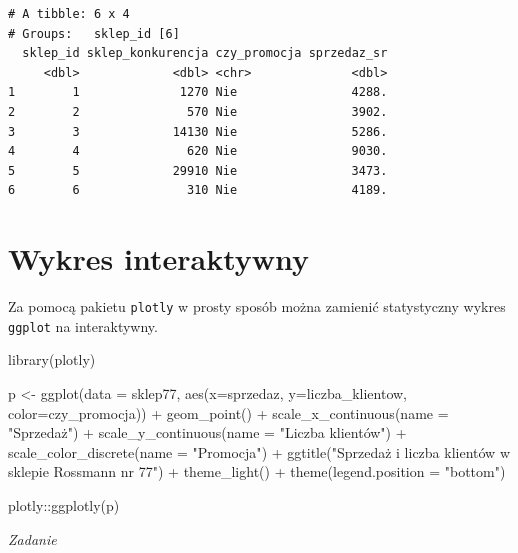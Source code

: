 \documentclass[
  letterpaper,
  DIV=11,
  numbers=noendperiod]{scrreprt}
\newenvironment{Shaded}{\begin{snugshade}}{\end{snugshade}}
\newcommand{\AttributeTok}[1]{\textcolor[rgb]{0.40,0.45,0.13}{#1}}
\newcommand{\FunctionTok}[1]{\textcolor[rgb]{0.28,0.35,0.67}{#1}}
\newcommand{\NormalTok}[1]{\textcolor[rgb]{0.00,0.23,0.31}{#1}}
\newcommand{\OtherTok}[1]{\textcolor[rgb]{0.00,0.23,0.31}{#1}}
\newcommand{\SpecialCharTok}[1]{\textcolor[rgb]{0.37,0.37,0.37}{#1}}
\newcommand{\StringTok}[1]{\textcolor[rgb]{0.13,0.47,0.30}{#1}}
\begin{document}
\begin{verbatim}
# A tibble: 6 x 4
# Groups:   sklep_id [6]
  sklep_id sklep_konkurencja czy_promocja sprzedaz_sr
     <dbl>             <dbl> <chr>              <dbl>
1        1              1270 Nie                4288.
2        2               570 Nie                3902.
3        3             14130 Nie                5286.
4        4               620 Nie                9030.
5        5             29910 Nie                3473.
6        6               310 Nie                4189.
\end{verbatim}

\hypertarget{wykres-interaktywny}{%
\section{Wykres interaktywny}\label{wykres-interaktywny}}

Za pomocą pakietu \texttt{plotly} w prosty sposób można zamienić
statystyczny wykres \texttt{ggplot} na interaktywny.

\begin{Shaded}
\begin{Highlighting}[]
\FunctionTok{library}\NormalTok{(plotly)}

\NormalTok{p }\OtherTok{\textless{}{-}} \FunctionTok{ggplot}\NormalTok{(}\AttributeTok{data =}\NormalTok{ sklep77, }\FunctionTok{aes}\NormalTok{(}\AttributeTok{x=}\NormalTok{sprzedaz, }\AttributeTok{y=}\NormalTok{liczba\_klientow, }\AttributeTok{color=}\NormalTok{czy\_promocja)) }\SpecialCharTok{+}
  \FunctionTok{geom\_point}\NormalTok{() }\SpecialCharTok{+}
  \FunctionTok{scale\_x\_continuous}\NormalTok{(}\AttributeTok{name =} \StringTok{"Sprzedaż"}\NormalTok{) }\SpecialCharTok{+}
  \FunctionTok{scale\_y\_continuous}\NormalTok{(}\AttributeTok{name =} \StringTok{"Liczba klientów"}\NormalTok{) }\SpecialCharTok{+}
  \FunctionTok{scale\_color\_discrete}\NormalTok{(}\AttributeTok{name =} \StringTok{"Promocja"}\NormalTok{) }\SpecialCharTok{+}
  \FunctionTok{ggtitle}\NormalTok{(}\StringTok{"Sprzedaż i liczba klientów w sklepie Rossmann nr 77"}\NormalTok{) }\SpecialCharTok{+}
  \FunctionTok{theme\_light}\NormalTok{() }\SpecialCharTok{+}
  \FunctionTok{theme}\NormalTok{(}\AttributeTok{legend.position =} \StringTok{"bottom"}\NormalTok{)}

\NormalTok{plotly}\SpecialCharTok{::}\FunctionTok{ggplotly}\NormalTok{(p)}
\end{Highlighting}
\end{Shaded}

\emph{Zadanie}
\end{document}
